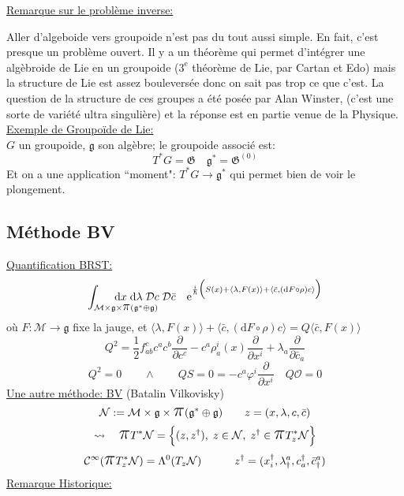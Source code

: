 \documentclass[a4paper,11pt]{article}
\renewcommand{\d}{{\mathrm{d}}}
\newcommand{\D}{{\mathcal{D}}}
\newcommand{\e}{{\mathrm{e}}}
\newcommand{\dr}[2]{\frac{\partial {#1}}{\partial{#2}}}
\newcommand{\ppi}{{\mathlarger{\mathlarger{\mathlarger{\pi}}}}}
\begin{document}
\noindent\underline{Remarque sur le problème inverse:}

Aller d'algeboide vers groupoide n'est pas du tout aussi simple. En fait, c'est presque un problème ouvert. Il y a un théorème qui permet d'intégrer une algèbroide de Lie en un groupoide ($3^\e$ théorème de Lie, par Cartan et Edo) mais la structure de Lie est assez bouleversée donc on sait pas trop ce que c'est. La question de la structure de ces groupes a été posée par Alan Winster, (c'est une sorte de variété ultra singulière) et la réponse est en partie venue de la Physique.\\

\noindent\underline{Exemple de Groupoïde de Lie:}\\
$G$ un groupoide, $\mathfrak{g}$ son algèbre; le groupoide associé est:
$$T^*G = \mathfrak{G} \quad \mathfrak{g}^*=\mathfrak{G}^{(0)}$$
Et on a une application ``moment": $T^*G \to \mathfrak{g}^*$ qui permet bien de voir le plongement.

\subsection{Méthode BV}
\underline{Quantification BRST:}
$$\int_{\mathcal M \times \mathfrak g \times \ppi(\mathfrak g^* \oplus \mathfrak g)}\!\!\!\!\!\!\!\!\!\!\!\!\!\!\!\!\!\!\!\!\!\!\!\!\!\d x\; \d\lambda\; \D c\; \D\bar c \quad \e^{\frac i\hbar \Big(S(x)+\langle\lambda,F(x)\rangle+\langle\bar c, (\d F\circ \rho) c\rangle\Big)}$$
où $F:\mathcal{M}\to\mathfrak g$ fixe la jauge, et $\langle\lambda,F(x)\rangle+\langle\bar c, (\d F\circ \rho) c\rangle = Q\langle\bar c, F(x)\rangle$
$$Q^2 = \frac12 f^c_{ab}c^ac^b\dr{}{c^c} - c^a\rho^i_a(x) \dr{}{x^i}+\lambda_a \dr{}{\bar c_a}$$
$$Q^2 = 0 \quad \quad \wedge \quad \quad QS=0=-c^a\varphi^i\dr{}{x^i} \quad Q\mathcal{O}=0$$
\underline{Une autre méthode: BV} (Batalin Vilkovisky)
$$\mathcal N := \mathcal{M}\times\mathfrak g \times \ppi(\mathfrak g^* \oplus \mathfrak g) \quad \quad z=(x,\lambda,c,\bar c)$$
$$\rightsquigarrow \quad \ppi T^*\mathcal N = \Big\{ (z,z^\dag), \; z\in\mathcal N, \; z^\dag\in\ppi T^*_z\mathcal N\Big\}$$
$$\mathcal C^\infty (\ppi T^*_z\mathcal N) = \Lambda^0 (T_z\mathcal N) \quad \quad \quad
z^\dag = (x_i^\dag, \lambda^a_\dag, c_a^\dag, \bar c_\dag^a)$$
\underline{Remarque Historique:}
\end{document}
